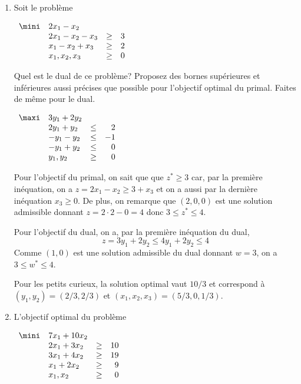 \begin{enumerate}
  \item Soit le problème

    $
    \begin{array}{llcr}
      \mini & 2x_1-x_2\\
      & 2x_1-x_2 -x_3 & \geq & 3\\
      & x_1-x_2 +x_3 & \geq & 2\\
      & x_1, x_2, x_3 & \geq & 0
    \end{array}
    $

    Quel est le dual de ce problème?
    Proposez des bornes supérieures et inférieures aussi précises que possible pour l'objectif optimal du primal.
    Faites de même pour le dual.

    \begin{solution}

      $
      \begin{array}{llcr}
        \maxi & 3y_1 + 2y_2\\
        & 2y_1 + y_2 & \leq & 2\\
        & -y_1 - y_2 & \leq & -1\\
        & -y_1 + y_2 & \leq & 0\\
        & y_1, y_2 & \geq & 0
      \end{array}
      $

      Pour l'objectif du primal, on sait que que $z^* \geq 3$ car,
      par la première inéquation, on a $z = 2x_1 - x_2 \geq 3 + x_3$ et on
      a aussi par la dernière inéquation $x_3 \geq 0$.
      De plus, on remarque que $(2, 0, 0)$ est une solution admissible donnant
      $z = 2\cdot 2 - 0 = 4$ donc $3 \leq z^* \leq 4$.

      Pour l'objectif du dual, on a, par la première inéquation du dual,
      $$ z = 3y_1 + 2y_2 \leq 4y_1 + 2y_2 \leq 4 $$
      Comme $(1, 0)$ est une solution admissible du dual donnant $w = 3$,
      on a $3 \leq w^* \leq 4$.

      Pour les petits curieux, la solution optimal vaut $10/3$ et correspond
      à $(y_1, y_2) = (2/3, 2/3)$ et $(x_1, x_2, x_3) = (5/3, 0, 1/3)$.
    \end{solution}

  \item L'objectif optimal du problème

    $
    \begin{array}{llcr}
      \mini & 7x_1+10x_2\\
      & 2x_1+3x_2 & \geq & 10\\
      & 3x_1+4x_2 & \geq & 19\\
      & x_1+2x_2 & \geq & 9\\
      & x_1, x_2 & \geq & 0
    \end{array}
    $


\end{enumerate}
